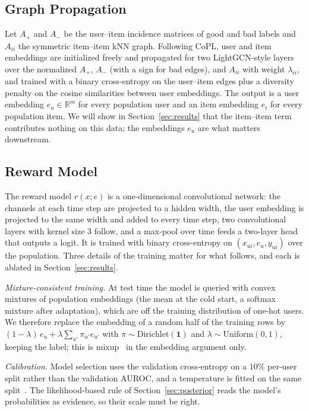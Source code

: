 \documentclass[conference]{IEEEtran}
\newcommand{\R}{\mathbb{R}}
\begin{document}
\subsection{Graph Propagation}
\label{sec:gcf}

Let $A_+$ and $A_-$ be the user--item incidence matrices of good and bad labels and $A_{ii}$ the symmetric item--item kNN graph. Following CoPL, user and item embeddings are initialized freely and propagated for two LightGCN-style layers~\cite{he2020lightgcn} over the normalized $A_+$, $A_-$ (with a sign for bad edges), and $A_{ii}$ with weight $\lambda_{ii}$, and trained with a binary cross-entropy on the user--item edges plus a diversity penalty on the cosine similarities between user embeddings. The output is a user embedding $e_u\in\R^{m}$ for every population user and an item embedding $e_i$ for every population item. We will show in Section~\ref{sec:results} that the item--item term contributes nothing on this data; the embeddings $e_u$ are what matters downstream.

\subsection{Reward Model}
\label{sec:rm}

The reward model $r(x;e)$ is a one-dimensional convolutional network: the channels at each time step are projected to a hidden width, the user embedding is projected to the same width and added to every time step, two convolutional layers with kernel size $3$ follow, and a max-pool over time feeds a two-layer head that outputs a logit. It is trained with binary cross-entropy on $(x_{ui},e_u,y_{ui})$ over the population. Three details of the training matter for what follows, and each is ablated in Section~\ref{sec:results}.

\emph{Mixture-consistent training.} At test time the model is queried with convex mixtures of population embeddings (the mean at the cold start, a softmax mixture after adaptation), which are off the training distribution of one-hot users. We therefore replace the embedding of a random half of the training rows by $(1-\lambda)\,e_u+\lambda\sum_{u'}\pi_{u'}e_{u'}$ with $\pi\sim\mathrm{Dirichlet}(\bm 1)$ and $\lambda\sim\mathrm{Uniform}(0,1)$, keeping the label; this is mixup~\cite{zhang2018mixup} in the embedding argument only.

\emph{Calibration.} Model selection uses the validation cross-entropy on a $10\%$ per-user split rather than the validation AUROC, and a temperature is fitted on the same split~\cite{guo2017calibration}. The likelihood-based rule of Section~\ref{sec:posterior} reads the model's probabilities as evidence, so their scale must be right.
\end{document}

